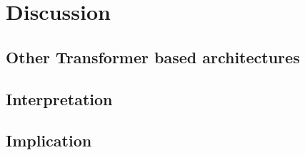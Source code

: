 \chapter{Discussion}

\label{Discussion} %

\section{Other Transformer based architectures}

\section{Interpretation}

\section{Implication}

